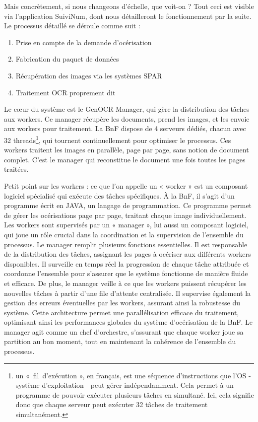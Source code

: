 \documentclass[a4paper,12pt,twoside]{book}
\begin{document}
	Mais concrètement, si nous changeons d’échelle, que voit-on ? Tout ceci est visible via l’application SuiviNum, dont nous détailleront le fonctionnement par la suite. Le processus détaillé se déroule comme suit :
	\begin{enumerate}
		\item Prise en compte de la demande d'océrisation
		\item Fabrication du paquet de données
		\item Récupération des images via les systèmes SPAR 
		\item Traitement OCR proprement dit
	\end{enumerate}
	Le cœur du système est le GenOCR Manager, qui gère la distribution des tâches aux workers. Ce manager récupère les documents, prend les images, et les envoie aux workers pour traitement. La BnF dispose de 4 serveurs dédiés, chacun avec 32 threads\footnote{un « fil d’exécution », en français, est une séquence d’instructions que l’OS - système d’exploitation - peut gérer indépendamment. Cela permet à un programme de pouvoir exécuter plusieurs tâches en simultané. Ici, cela signifie donc que chaque serveur peut exécuter 32 tâches de traitement simultanément. }, qui tournent continuellement pour optimiser le processus. Ces workers traitent les images en parallèle, page par page, sans notion de document complet. C'est le manager qui reconstitue le document une fois toutes les pages traitées. 
	
	Petit point sur les workers : ce que l'on appelle un « worker » est un composant logiciel spécialisé qui exécute des tâches spécifiques. À la BnF, il s'agit d'un programme écrit en JAVA, un langage de programmation. Ce programme permet de gérer les océrisations page par page, traitant chaque image individuellement. Les workers sont supervisés par un « manager », lui aussi un composant logiciel, qui joue un rôle crucial dans la coordination et la supervision de l'ensemble du processus. Le manager remplit plusieurs fonctions essentielles. Il est responsable de la distribution des tâches, assignant les pages à océriser aux différents workers disponibles. Il surveille en temps réel la progression de chaque tâche attribuée et coordonne l'ensemble pour s'assurer que le système fonctionne de manière fluide et efficace. De plus, le manager veille à ce que les workers puissent récupérer les nouvelles tâches à partir d'une file d'attente centralisée. Il supervise également la gestion des erreurs éventuelles par les workers, assurant ainsi la robustesse du système. Cette architecture permet une parallélisation efficace du traitement, optimisant ainsi les performances globales du système d'océrisation de la BnF. Le manager agit comme un chef d'orchestre, s'assurant que chaque worker joue sa partition au bon moment, tout en maintenant la cohérence de l'ensemble du processus.
	
\end{document}
